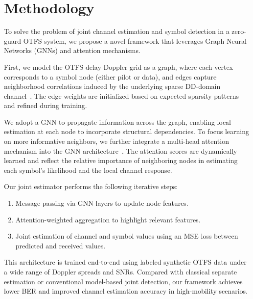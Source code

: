 \documentclass{article}
\begin{document}
\section{Methodology}

To solve the problem of joint channel estimation and symbol detection in a zero-guard OTFS system, we propose a novel framework that leverages Graph Neural Networks (GNNs) and attention mechanisms.

First, we model the OTFS delay-Doppler grid as a graph, where each vertex corresponds to a symbol node (either pilot or data), and edges capture neighborhood correlations induced by the underlying sparse DD-domain channel~\cite{Kipf2017_GCN}. The edge weights are initialized based on expected sparsity patterns and refined during training.

We adopt a GNN to propagate information across the graph, enabling local estimation at each node to incorporate structural dependencies. To focus learning on more informative neighbors, we further integrate a multi-head attention mechanism into the GNN architecture~\cite{Velickovic2018_GAT}. The attention scores are dynamically learned and reflect the relative importance of neighboring nodes in estimating each symbol's likelihood and the local channel response.

Our joint estimator performs the following iterative steps:
\begin{enumerate}
    \item Message passing via GNN layers to update node features.
    \item Attention-weighted aggregation to highlight relevant features.
    \item Joint estimation of channel and symbol values using an MSE loss between predicted and received values.
\end{enumerate}

This architecture is trained end-to-end using labeled synthetic OTFS data under a wide range of Doppler spreads and SNRs. Compared with classical separate estimation or conventional model-based joint detection, our framework achieves lower BER and improved channel estimation accuracy in high-mobility scenarios.




\end{document}
